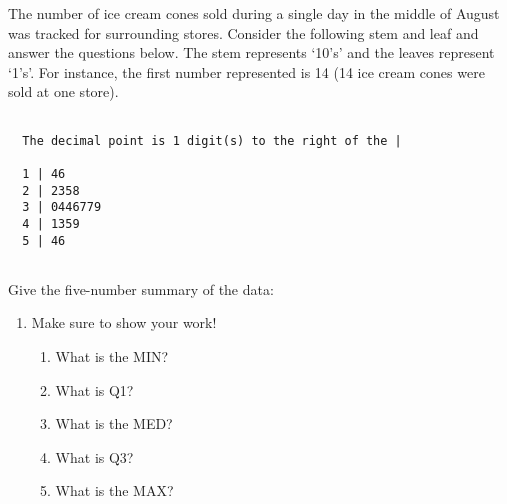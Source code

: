 \documentclass[11pt]{book}\usepackage[]{graphicx}\usepackage[]{color}
\begin{document}
\begin{exercises}
\begin{exercise}
\begin{center}
\end{center}

The number of ice cream cones sold during a single day in the middle of August was tracked for surrounding stores.  Consider the following stem and leaf and answer the  questions below. The stem represents `10's' and the leaves represent `1's'.  For instance, the first number represented is 14 (14 ice cream cones were sold at one store).

\vspace{-4mm}

{\small{
\begin{verbatim}

  The decimal point is 1 digit(s) to the right of the |

  1 | 46
  2 | 2358
  3 | 0446779
  4 | 1359
  5 | 46


\end{verbatim}
}}

\vspace{-4mm}

\begin{minipage}[ht]{7cm}

{\small{Give the five-number summary of the data:}}

\vspace{-2mm}

{\small{
\begin{enumerate}
  \item Make sure to show your work!
  \begin{enumerate}
    \item What is the MIN?
    \item	What is Q1?
    \item	What is the MED?
    \item What is Q3?
    \item What is the MAX?
  \end{enumerate}


\end{enumerate}}}
\end{minipage}
\end{exercise}
\end{exercises}
\end{document}

